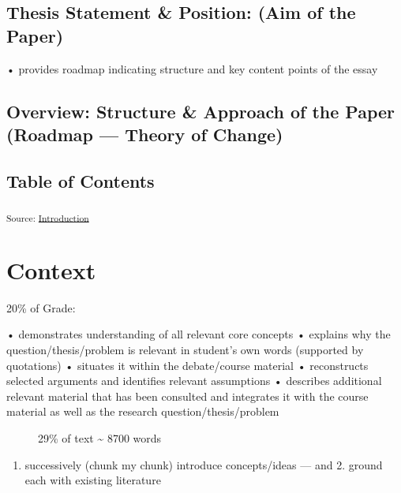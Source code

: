\documentclass[11pt,a4paper]{report}
\begin{document}
\subsection{Thesis Statement \& Position: (Aim of the
Paper)}\label{thesis-statement-position-aim-of-the-paper}

• provides roadmap indicating structure and key content points of the
essay

\subsection{Overview: Structure \& Approach of the Paper (Roadmap ---
Theory of
Change)}\label{overview-structure-approach-of-the-paper-roadmap-theory-of-change}

\subsection{Table of Contents}\label{table-of-contents}

\textsubscript{Source:
\href{https://VJMeyer.github.io/submission/chapters/Introduction-preview.html\#40deb343-cdea-4c03-8a1e-f2c753f3fa02}{Introduction}}

\section{Context}\label{context}

20\% of Grade:

\begin{description}
\item[• demonstrates understanding of all relevant core concepts •
explains why the question/thesis/problem is relevant in student's own
words (supported by quotations) • situates it within the debate/course
material • reconstructs selected arguments and identifies relevant
assumptions • describes additional relevant material that has been
consulted and integrates it with the course material as well as the
research question/thesis/problem]
29\% of text \textasciitilde{} 8700 words
\end{description}

\begin{enumerate}
\def\labelenumi{\arabic{enumi}.}
\tightlist
\item
  successively (chunk my chunk) introduce concepts/ideas --- and 2.
  ground each with existing literature
\end{enumerate}

\section{}\label{section-2}
\end{document}
